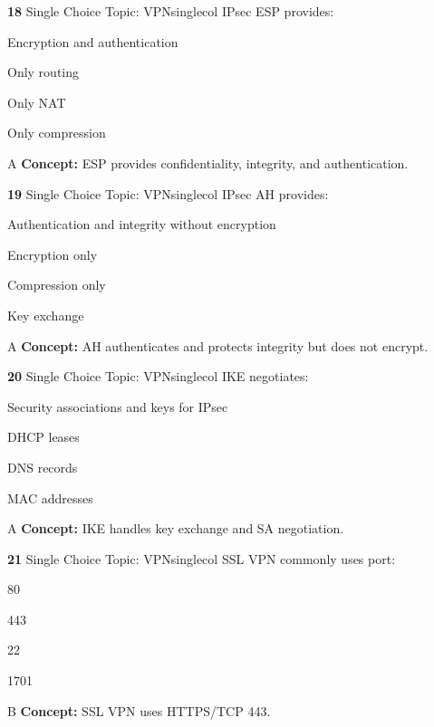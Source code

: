 \documentclass[10pt,a4paper]{article}
\begin{document}
\begin{qcard}{\color{white}\textbf{18} \hfill \small Single Choice \textbar{} Topic: VPN}{singlecol}
IPsec ESP provides:

\begin{qoptions}
\item Encryption and authentication
\item Only routing
\item Only NAT
\item Only compression
\end{qoptions}
\begin{explainbox}{A}
\textbf{Concept:} ESP provides confidentiality, integrity, and authentication.
\end{explainbox}
\end{qcard}

\begin{qcard}{\color{white}\textbf{19} \hfill \small Single Choice \textbar{} Topic: VPN}{singlecol}
IPsec AH provides:

\begin{qoptions}
\item Authentication and integrity without encryption
\item Encryption only
\item Compression only
\item Key exchange
\end{qoptions}
\begin{explainbox}{A}
\textbf{Concept:} AH authenticates and protects integrity but does not encrypt.
\end{explainbox}
\end{qcard}

\begin{qcard}{\color{white}\textbf{20} \hfill \small Single Choice \textbar{} Topic: VPN}{singlecol}
IKE negotiates:

\begin{qoptions}
\item Security associations and keys for IPsec
\item DHCP leases
\item DNS records
\item MAC addresses
\end{qoptions}
\begin{explainbox}{A}
\textbf{Concept:} IKE handles key exchange and SA negotiation.
\end{explainbox}
\end{qcard}

\begin{qcard}{\color{white}\textbf{21} \hfill \small Single Choice \textbar{} Topic: VPN}{singlecol}
SSL VPN commonly uses port:

\begin{qoptions}
\item 80
\item 443
\item 22
\item 1701
\end{qoptions}
\begin{explainbox}{B}
\textbf{Concept:} SSL VPN uses HTTPS/TCP 443.
\end{explainbox}
\end{qcard}
\end{document}
